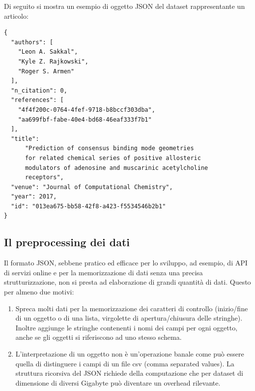 \documentclass[a4paper, 12pt]{article}
\begin{document}
Di seguito si mostra un esempio di oggetto JSON del dataset rappresentante un articolo:
\begin{lstlisting}[keepspaces=true]
{
  "authors": [
    "Leon A. Sakkal",
    "Kyle Z. Rajkowski",
    "Roger S. Armen"
  ],
  "n_citation": 0,
  "references": [
    "4f4f200c-0764-4fef-9718-b8bccf303dba",
    "aa699fbf-fabe-40e4-bd68-46eaf333f7b1"
  ],
  "title":
      "Prediction of consensus binding mode geometries
      for related chemical series of positive allosteric
      modulators of adenosine and muscarinic acetylcholine
      receptors",
  "venue": "Journal of Computational Chemistry",
  "year": 2017,
  "id": "013ea675-bb58-42f8-a423-f5534546b2b1"
}
\end{lstlisting}
\subsection{Il preprocessing dei dati}
Il formato JSON, sebbene pratico ed efficace per lo sviluppo, ad esempio, di API di servizi online e per la memorizzazione di dati senza una precisa strutturizzazione, non si presta ad elaborazione di grandi quantità di dati. Questo per almeno due motivi:
\begin{enumerate}
  \item Spreca molti dati per la memorizzazione dei caratteri di controllo (inizio/fine di un oggetto o di una lista, virgolette di apertura/chiusura delle stringhe). Inoltre aggiunge le stringhe contenenti i nomi dei campi per ogni oggetto, anche se gli oggetti si riferiscono ad uno stesso schema.
  \item L'interpretazione di un oggetto non è un'operazione banale come può essere quella di distinguere i campi di un file csv (comma separated values). La struttura ricorsiva del JSON richiede della computazione che per dataset di dimensione di diversi Gigabyte può diventare un overhead rilevante.
\end{enumerate}
\end{document}
